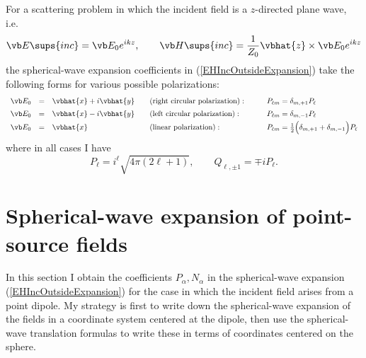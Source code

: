 \documentclass[letterpaper]{article}
\newcommand{\lm}{_{\ell m}}
\begin{document}
For a scattering problem in which the incident field
is a $z$-directed plane wave, i.e.
$$
 \vb E\sups{inc}=\vb E_0e^{ik z}, \qquad 
 \vb H\sups{inc}=\frac{1}{Z_0}\vbhat{z}\times \vb E_0 e^{ik z}
$$
the spherical-wave expansion coefficients in (\ref{EHIncOutsideExpansion})
take the following forms for various possible polarizations:
$$\begin{array}{rclll}
\vb E_0 &=& \vbhat{x} + i\vbhat{y} 
 \quad &\text{(right circular polarization)}:
 \qquad &P\lm=\delta_{m,+1}P_\ell
\\[5pt]
\vb E_0 &=& \vbhat{x} - i\vbhat{y} 
 \quad &\text{(left circular polarization)}:
 \qquad &P\lm=\delta_{m,-1}P_\ell 
\\[3pt]
\vb E_0 &=& \vbhat{x}
 \quad &\text{(linear polarization)}:
 \qquad &P\lm=\frac{1}{2}\Big(\delta_{m,+1} + \delta_{m,-1}\Big)P_\ell 
\end{array}$$
where in all cases I have
$$ P_\ell = i^\ell \sqrt{4\pi(2\ell +1)}, \qquad  
   Q_{\ell, \pm 1} = \mp i P_\ell.
$$

\newpage
\section{Spherical-wave expansion of point-source fields}
\label{PointSourceSection}

In this section I obtain the coefficients $P_\alpha, N_\alpha$
in the spherical-wave expansion (\ref{EHIncOutsideExpansion})
for the case in which the incident field arises from a
point dipole. My strategy is first to write down the
spherical-wave expansion of the fields in a coordinate
system centered at the dipole, then use the spherical-wave
translation formulas to write these in terms of 
coordinates centered on the sphere.

\end{document}
